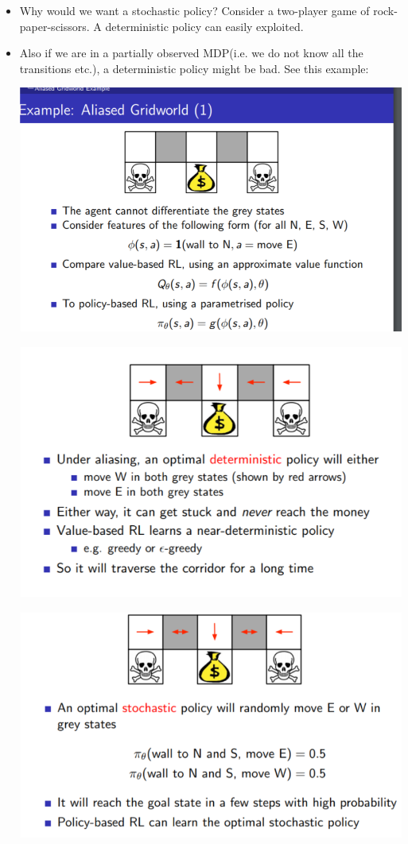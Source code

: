\documentclass[a4paper]{article}
\begin{document}
\begin{itemize}
    \item  Why would we want a stochastic policy? Consider a two-player game of rock-paper-scissors. A deterministic policy can easily exploited. 
    \item Also if we are in a partially observed MDP(i.e. we do not know all the transitions etc.), a deterministic policy might be bad. See this example: 
      \begin{center}
    \includegraphics[width = \textwidth]{images/ex1.png}
    \end{center}
      \begin{center}
    \includegraphics[width = \textwidth]{images/ex2.png}
    \end{center}
      \begin{center}
    \includegraphics[width = \textwidth]{images/ex.png}

\end{center}
\end{itemize}
\end{document}
